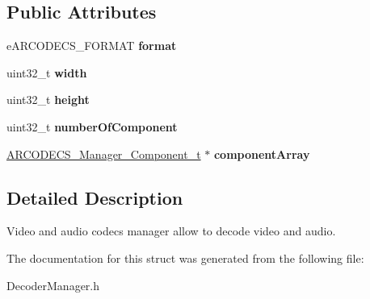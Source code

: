 \subsection*{Public Attributes}
\begin{DoxyCompactItemize}
\item 
\hypertarget{struct__ARCODECS__Manager__Frame__t___a4d166b423ec535a87c6b8af430962eae}{}e\+A\+R\+C\+O\+D\+E\+C\+S\+\_\+\+F\+O\+R\+M\+A\+T {\bfseries format}\label{struct__ARCODECS__Manager__Frame__t___a4d166b423ec535a87c6b8af430962eae}

\item 
\hypertarget{struct__ARCODECS__Manager__Frame__t___a7429d7be2c65a64558b087e076250b08}{}uint32\+\_\+t {\bfseries width}\label{struct__ARCODECS__Manager__Frame__t___a7429d7be2c65a64558b087e076250b08}

\item 
\hypertarget{struct__ARCODECS__Manager__Frame__t___a553fa419c0a93a12e67a3f24ffa9a3bf}{}uint32\+\_\+t {\bfseries height}\label{struct__ARCODECS__Manager__Frame__t___a553fa419c0a93a12e67a3f24ffa9a3bf}

\item 
\hypertarget{struct__ARCODECS__Manager__Frame__t___a599595f4fceb2f0ca330c14780da468f}{}uint32\+\_\+t {\bfseries number\+Of\+Component}\label{struct__ARCODECS__Manager__Frame__t___a599595f4fceb2f0ca330c14780da468f}

\item 
\hypertarget{struct__ARCODECS__Manager__Frame__t___afee2d4971c9a9dcaeb9fc2b1d182727c}{}\hyperlink{struct__ARCODECS__Manager__Component__t__}{A\+R\+C\+O\+D\+E\+C\+S\+\_\+\+Manager\+\_\+\+Component\+\_\+t} $\ast$ {\bfseries component\+Array}\label{struct__ARCODECS__Manager__Frame__t___afee2d4971c9a9dcaeb9fc2b1d182727c}

\end{DoxyCompactItemize}


\subsection{Detailed Description}
Video and audio codecs manager allow to decode video and audio. 

The documentation for this struct was generated from the following file\+:\begin{DoxyCompactItemize}
\item 
Decoder\+Manager.\+h\end{DoxyCompactItemize}
